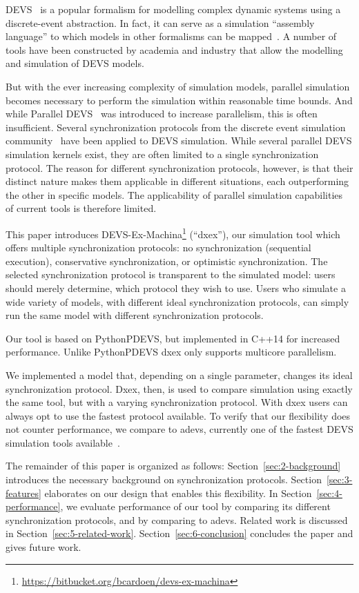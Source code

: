 \textsf{DEVS}~\cite{ClassicDEVS} is a popular formalism for modelling complex dynamic systems using a discrete-event abstraction.
In fact, it can serve as a simulation ``assembly language'' to which models in other formalisms can be mapped~\cite{DEVSbase}.
A number of tools have been constructed by academia and industry that allow the modelling and simulation of \textsf{DEVS} models.

But with the ever increasing complexity of simulation models, parallel simulation becomes necessary to perform the simulation within reasonable time bounds.
And while \textsf{Parallel DEVS}~\cite{ParallelDEVS} was introduced to increase parallelism, this is often insufficient.
Several synchronization protocols from the discrete event simulation community~\cite{FujimotoBook} have been applied to \textsf{DEVS} simulation.
While several parallel \textsf{DEVS} simulation kernels exist, they are often limited to a single synchronization protocol.
The reason for different synchronization protocols, however, is that their distinct nature makes them applicable in different situations, each outperforming the other in specific models.
The applicability of parallel simulation capabilities of current tools is therefore limited.

This paper introduces DEVS-Ex-Machina\footnote{\url{https://bitbucket.org/bcardoen/devs-ex-machina}} (``dxex''), our simulation tool which offers multiple synchronization protocols: no synchronization (sequential execution), conservative synchronization, or optimistic synchronization.
The selected synchronization protocol is transparent to the simulated model: users should merely determine, which protocol they wish to use.
Users who simulate a wide variety of models, with different ideal synchronization protocols, can simply run the same model with different synchronization protocols.

Our tool is based on PythonPDEVS, but implemented in C++14 for increased performance.
Unlike PythonPDEVS dxex only supports multicore parallelism.

We implemented a model that, depending on a single parameter, changes its ideal synchronization protocol.
Dxex, then, is used to compare simulation using exactly the same tool, but with a varying synchronization protocol. With dxex users can always opt to use the fastest protocol available.
To verify that our flexibility does not counter performance, we compare to adevs, currently one of the fastest \textsf{DEVS} simulation tools available~\cite{PythonPDEVS,DEVSSurvey}.

The remainder of this paper is organized as follows:
Section~\ref{sec:2-background} introduces the necessary background on synchronization protocols.
Section~\ref{sec:3-features} elaborates on our design that enables this flexibility.
In Section~\ref{sec:4-performance}, we evaluate performance of our tool by comparing its different synchronization protocols, and by comparing to adevs.
Related work is discussed in Section~\ref{sec:5-related-work}.
Section~\ref{sec:6-conclusion} concludes the paper and gives future work.
